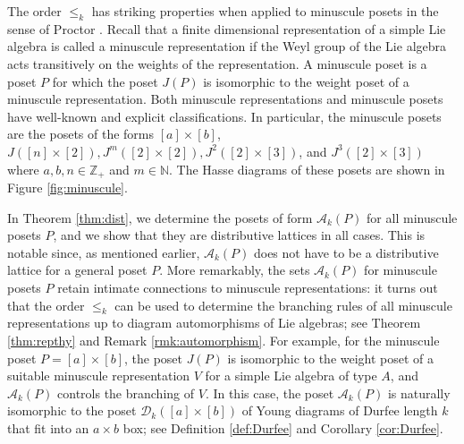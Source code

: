 \documentclass[11pt]{amsart}
\theoremstyle{plain}
\theoremstyle{definition}
\theoremstyle{remark}
\numberwithin{equation}{section}
\newcommand{\Z}{{\mathbb Z}}
\newcommand{\N}{\mathbb{N}}
\newcommand{\cala}{\mathcal{A}}
\newcommand{\akp}{\mathcal{A}_k(P)}
\newcommand{\dkab}{\mathcal{D}_k([a]\times[b])}
\begin{document}
The order $\le_k$ has striking properties when applied to minuscule posets in
the sense of Proctor \cite{proctor84}. Recall that a finite dimensional
representation of a simple Lie algebra is called a minuscule representation if
the Weyl group of the Lie algebra acts transitively on the weights of the
representation. A minuscule poset is a poset $P$ for which the poset $J(P)$ is
isomorphic to the weight poset of a minuscule representation. Both minuscule
representations and minuscule posets have well-known and explicit
classifications. In particular, the minuscule posets are the posets
of the forms $[a]\times [b]$, $J([n]\times [2]), J^m([2]\times [2]),
J^2([2]\times [3])$, and $J^3([2]\times [3])$ where $a,b,n\in \Z_+$ and $m\in
\N$. The Hasse diagrams of these posets are shown in Figure \ref{fig:minuscule}. 

In Theorem \ref{thm:dist}, we determine the posets of form $\akp$ for all
minuscule posets $P$, and we show that they are distributive lattices in all
cases.  This is notable since, as mentioned earlier, $\akp$ does not have to be
a distributive lattice for a general poset $P$. More remarkably, the sets $\akp$
for minuscule posets $P$ retain intimate connections to minuscule
representations: it turns out that the order $\le_k$ can be used to determine
the branching rules of all minuscule representations up to diagram automorphisms
of Lie algebras; see Theorem \ref{thm:repthy} and Remark \ref{rmk:automorphism}.
For example, for the minuscule poset $P = [a] \times [b]$, the poset $J(P)$ is
isomorphic to the weight poset of a suitable minuscule representation $V$ for a
simple Lie algebra of type $A$, and $\akp$ controls the branching of $V$. In
this case, the poset $\cala_k(P)$ is naturally isomorphic to the poset $\dkab$
of Young diagrams of Durfee length $k$ that fit into an $a \times b$ box; see
Definition \ref{def:Durfee} and Corollary \ref{cor:Durfee}. 
\end{document}
